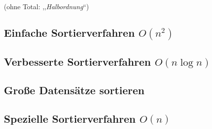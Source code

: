 (ohne Total: ,,\emph{Halbordnung}``)

\subsection{Einfache Sortierverfahren $O(n^2)$}
\subsection{Verbesserte Sortierverfahren $O(n \log n)$}
\subsection{Gro\ss e Datensätze sortieren}
\subsection{Spezielle Sortierverfahren $O(n)$}

\mzBreak

